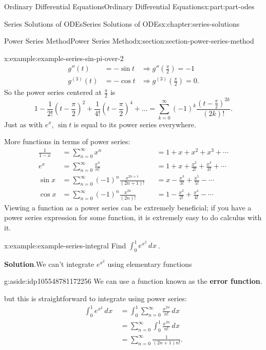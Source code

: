 \documentclass[oneside,10pt,]{book}
\newcommand{\blocktitlefont}{\relax}
\newcommand{\terminology}[1]{\textbf{#1}}
\numberwithin{equation}{part}
\newcommand{\dd}[2][]{\, d^{#1} #2\ }
\newcommand{\amp}{&}
\begin{document}
\begin{partptx}{Ordinary Differential Equations}{}{Ordinary Differential Equations}{}{}{x:part:part-odes}
\begin{chapterptx}{Series Solutions of ODEs}{}{Series Solutions of ODEs}{}{}{x:chapter:series-solutions}
\begin{sectionptx}{Power Series Method}{}{Power Series Method}{}{}{x:section:section-power-series-method}
\begin{example}{}{x:example:example-series-sin-pi-over-2}
\begin{align*}
g''(t) \amp= -\sin t \amp\Rightarrow g''(\frac{\pi}{2}) = -1\\
g^{(3)}(t) \amp= -\cos t \amp\Rightarrow g^{(3)}(\frac{\pi}{2}) = 0\text{.}
\end{align*}
So the power series centered at \(\frac{\pi}{2}\) is%
\begin{equation*}
1 - \frac{1}{2!}(t-\frac{\pi}{2})^{2} + \frac{1}{4!}(t-\frac{\pi}{2})^{4}+\dots = \sum_{k=0}^{\infty}(-1)^{k}\frac{(t-\frac{\pi}{2})^{2k}}{(2k)!}.
\end{equation*}
Just as with \(e^{x}\), \(\sin t\) is equal to its power series everywhere.%
\end{example}
More functions in terms of power series:%
\begin{align*}
\frac{1}{1-x} \amp= \sum_{n=0}^{\infty}x^{n} \amp \amp= 1 + x + x^{2} + x^{3} + \cdots\\
e^{x} \amp= \sum_{n=0}^{\infty}\frac{x^{n}}{n!} \amp \amp= 1 + x + \frac{x^{2}}{2!} + \frac{x^{3}}{3!} + \cdots\\
\sin x \amp= \sum_{n=0}^{\infty}(-1)^{n}\frac{x^{2n+1}}{(2n+1)!} \amp \amp= x - \frac{x^{3}}{3!} + \frac{x^{5}}{5!} - \cdots\\
\cos x \amp= \sum_{n=0}^{\infty}(-1)^{n}\frac{x^{2n}}{(2n)!} \amp \amp= 1 - \frac{x^{2}}{2!} + \frac{x^{4}}{4!} - \cdots
\end{align*}
Viewing a function as a power series can be extremely beneficial; if you have a power series expression for some function, it is extremely easy to do calculus with it.%
\begin{example}{}{x:example:example-series-integral}%
Find \(\displaystyle\int_{0}^{1}e^{x^{2}}\dd{x}\).%
\par\smallskip%
\noindent\textbf{\blocktitlefont Solution}.\hypertarget{g:solution:idp105548781171488}{}\quad{}We can't integrate \(e^{x^{2}}\) using elementary functions \begin{aside}{}{g:aside:idp105548781172256}%
We can use a function known as the \terminology{error function}.%
\end{aside}
 but this is straightforward to integrate using power series:%
\begin{align*}
\int_{0}^{1}e^{x^{2}}\dd{x} \amp= \int_{0}^{1}\sum_{n=0}^{\infty}\frac{x^{2n}}{n!}\dd{x}\\
\amp= \sum_{n=0}^{\infty}\int_{0}^{1}\frac{x^{2n}}{n!}\dd{x}\\
\amp= \sum_{n=0}^{\infty}\frac{1}{(2n+1)n!}\text{.}
\end{align*}
%
\end{example}

\end{sectionptx}
\end{chapterptx}
\end{partptx}
\end{document}
